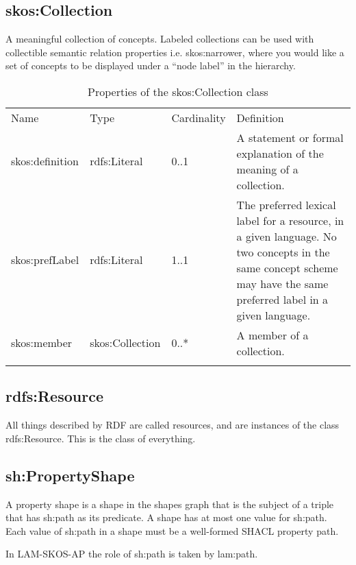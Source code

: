 \subsection{skos:Collection}

A meaningful collection of concepts. Labeled collections can be used
with collectible semantic relation properties i.e. skos:narrower, where
you would like a set of concepts to be displayed under a ``node label'' in
the hierarchy.

{
	\footnotesize
	\selectfont%
	\begin{longtable}[c]{@{}p{3cm}p{2cm}p{2cm}p{7.8cm}@{}}
		\toprule\addlinespace
		Name & Type & Cardinality & Definition
		\\\addlinespace
		\midrule\endhead
		skos:definition & rdfs:Literal & 0..1 & A statement or formal
		explanation of the meaning of a collection.
		\\\addlinespace
		skos:prefLabel & rdfs:Literal & 1..1 & The preferred lexical label for a
		resource, in a given language. No two concepts in the same concept
		scheme may have the same preferred label in a given language.
		\\\addlinespace
		skos:member & skos:Collection & 0..* & A member of a collection.
		\\\addlinespace
		\bottomrule
		\addlinespace
		\caption{Properties of the skos:Collection class}
	\end{longtable}
}

\subsection{rdfs:Resource}

All things described by RDF are called resources, and are instances of
the class rdfs:Resource. This is the class of everything.

\subsection{sh:PropertyShape}

A property shape is a shape in the shapes graph that is the subject of a
triple that has sh:path as its predicate. A shape has at most one value
for sh:path. Each value of sh:path in a shape must be a well-formed
SHACL property path. 

In LAM-SKOS-AP the role of sh:path is taken by lam:path.

